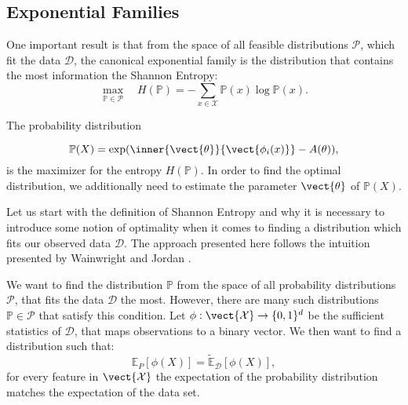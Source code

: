     
    \subsection{Exponential Families}
    \label{ssec:expf}
    One important result is that from the space of all feasible distributions $\mathcal{P}$, which fit the data $\mathcal{D}$, the canonical exponential family is the distribution that contains the most information \wrt the Shannon Entropy:
    \begin{equation}
    \max_{\mathbb{P}\in \mathcal{P}} \quad  H(\mathbb{P}) = - \sum_{x\in\mathcal{X}} \mathbb{P}(x) \log \mathbb{P}(x).
    \end{equation}

    The probability distribution

    \begin{equation}
        \mathbb{P}(X) = \exp(\inner{\vect{\theta}}{\vect{\phi_i(x)}} - A(\theta)),
    \end{equation}
    is the maximizer for the entropy $H(\mathbb{P})$.
    In order to find the optimal distribution, we additionally need to estimate the parameter $\vect{\theta}$ of $\mathbb{P}(X)$.

    Let us start with the definition of Shannon Entropy and why it is necessary to introduce some notion of optimality when it comes to finding a distribution which fits our observed data $\mathcal{D}$.
    The approach presented here follows the intuition presented by Wainwright and Jordan \cite{wainwright2008graphical}.

    We want to find the distribution $\mathbb{P}$ from the space of all probability distributions $\mathcal{P}$, that fits the data  $\mathcal{D}$ the most.
    However,  there are many such distributions $\mathbb{P} \in \mathcal{P}$ that satisfy this condition. 
    Let $\phi: \vect{\mathcal{X}}  \rightarrow \{0,1\}^d$ be the sufficient statistics of $\mathcal{D}$, that maps observations to a binary vector. 
    We then want to find a distribution such that:
    \begin{equation}
        \label{eq:expecval}
        \mathbb{E}_P[\phi(X)] = \tilde{\mathbb{E}}_{\mathcal{D}}[\phi(X)], 
    \end{equation}
    for every feature in $\vect{\mathcal{X}}$ the expectation of the probability distribution matches the expectation of the data set.

